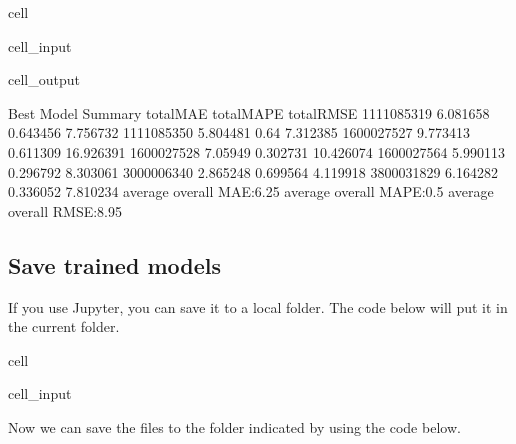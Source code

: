\documentclass[letterpaper,10pt,english]{jupyterBook}
\begin{document}
\begin{sphinxuseclass}{cell}
\begin{sphinxVerbatimInput}
\begin{sphinxuseclass}{cell_input}
\end{sphinxuseclass}\end{sphinxVerbatimInput}
\begin{sphinxVerbatimOutput}

\begin{sphinxuseclass}{cell_output}
\begin{sphinxVerbatim}[commandchars=\\\{\}]
Best Model Summary
            totalMAE totalMAPE  totalRMSE
1111085319  6.081658  0.643456   7.756732
1111085350  5.804481      0.64   7.312385
1600027527  9.773413  0.611309  16.926391
1600027528   7.05949  0.302731  10.426074
1600027564  5.990113  0.296792   8.303061
3000006340  2.865248  0.699564   4.119918
3800031829  6.164282  0.336052   7.810234
average overall MAE:6.25
average overall MAPE:0.5
average overall RMSE:8.95
\end{sphinxVerbatim}

\end{sphinxuseclass}\end{sphinxVerbatimOutput}

\end{sphinxuseclass}

\subsection{Save trained models}
\label{\detokenize{docs/Case1_2_Module1A_Retail_Demand_Model:save-trained-models}}
\sphinxAtStartPar
If you use Jupyter, you can save it to a local folder. The code below will put it in the current folder.

\begin{sphinxuseclass}{cell}\begin{sphinxVerbatimInput}

\begin{sphinxuseclass}{cell_input}
\begin{sphinxVerbatim}[commandchars=\\\{\}]
  
\end{sphinxVerbatim}

\end{sphinxuseclass}\end{sphinxVerbatimInput}

\end{sphinxuseclass}
\sphinxAtStartPar
Now we can save the files to the folder indicated by using the code below.
\end{document}
